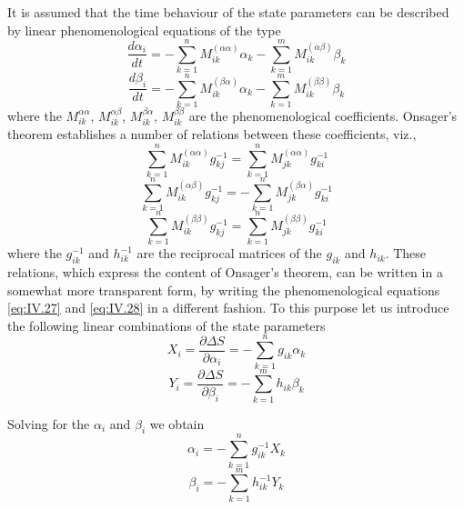 It is assumed that the time behaviour of the state parameters can be described by linear phenomenological equations of the type
\begin{equation}
\frac{d \alpha_i}{d t} = - \sum_{k=1}^n M_{ik}^{(\alpha \alpha)} \alpha_k - \sum_{k=1}^m M_{ik}^{(\alpha \beta)} \beta_k 
    \label{eq:IV.27}
\end{equation}
\begin{equation}
\frac{d \beta_i}{d t} = - \sum_{k=1}^n M_{ik}^{(\beta \alpha)} \alpha_k - \sum_{k=1}^m M_{ik}^{(\beta \beta)} \beta_k
    \label{eq:IV.28}
\end{equation}
where the $M_{ik}^{\alpha \alpha}$, $M_{ik}^{\alpha \beta}$, $M_{ik}^{\beta \alpha}$, $M_{ik}^{\beta \beta}$ are the phenomenological coefficients. Onsager's theorem establishes a number of relations between these coefficients, viz.,
\begin{equation}
\sum_{k=1}^n M_{ik}^{(\alpha \alpha)} g_{kj}^{-1} = \sum_{k=1}^n M_{jk}^{(\alpha \alpha)} g_{ki}^{-1}
    \label{eq:IV.29}
\end{equation}
\begin{equation}
\sum_{k=1}^n M_{ik}^{(\alpha \beta)} g_{kj}^{-1} = - \sum_{k=1}^n M_{jk}^{(\beta \alpha)} g_{ki}^{-1}
    \label{eq:IV.30}
\end{equation}
\begin{equation}
\sum_{k=1}^n M_{ik}^{(\beta \beta)} g_{kj}^{-1} = \sum_{k=1}^n M_{jk}^{(\beta \beta)} g_{ki}^{-1}
    \label{eq:IV.31}
\end{equation}
where the $g_{ik}^{-1}$ and $h_{ik}^{-1}$ are the reciprocal matrices of the $g_{ik}$ and $h_{ik}$. These relations, which express the content of Onsager's theorem, can be written in a somewhat more transparent form, by writing the phenomenological equations \eqref{eq:IV.27} and \eqref{eq:IV.28} in a different fashion. To this purpose let us introduce the following linear combinations of the state parameters
\begin{equation}
X_i = \frac{\partial \Delta S}{\partial \alpha_i} = - \sum_{k=1}^n g_{ik} \alpha_k
    \label{eq:IV.32}
\end{equation}
\begin{equation}
Y_i = \frac{\partial \Delta S}{\partial \beta_i} = - \sum_{k=1}^m h_{ik} \beta_k
    \label{eq:IV.33}
\end{equation}

Solving for the $\alpha_i$ and $\beta_i$ we obtain
\begin{equation}
\alpha_i = - \sum_{k=1}^n g_{ik}^{-1} X_k
    \label{eq:IV.34}
\end{equation}
\begin{equation}
\beta_i = - \sum_{k=1}^m h_{ik}^{-1} Y_k
    \label{eq:IV.35}
\end{equation}

